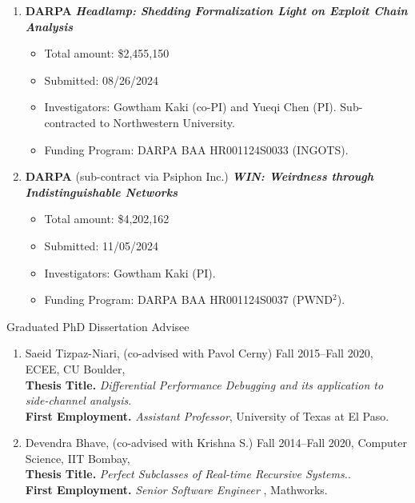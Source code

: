 \documentclass{article}
\begin{document}
\begin{enumerate}
\item {\bf DARPA} {\bf\emph{Headlamp: Shedding Formalization Light on Exploit Chain Analysis}} 
  \begin{itemize}
  \item
    Total amount: \$2,455,150 
  \item  
    Submitted: 08/26/2024 
  \item 
    Investigators: Gowtham Kaki (co-PI) and Yueqi Chen (PI). Sub-contracted
    to Northwestern University. 
  \item 
      Funding Program: DARPA BAA HR001124S0033 (INGOTS).  
  \end{itemize}

\item {\bf DARPA} (sub-contract via Psiphon Inc.) {\bf\emph{WIN: Weirdness through Indistinguishable Networks}} 
  \begin{itemize}
  \item
    Total amount: \$4,202,162
  \item  
    Submitted: 11/05/2024 
  \item 
    Investigators: Gowtham Kaki (PI). 
  \item 
      Funding Program:  DARPA BAA HR001124S0037 (PWND$^2$).  
  \end{itemize}

\end{enumerate}


\vspace{1em}
\noindent Graduated PhD Dissertation Advisee
\begin{enumerate}
\item Saeid Tizpaz-Niari, (co-advised with Pavol Cerny) Fall 2015--Fall 2020,
ECEE, CU Boulder,\\
{\bf Thesis Title.} {\em Differential Performance Debugging and its application to
side-channel analysis}. \\{\bf First Employment.} {\it Assistant Professor},
University of Texas at El Paso. 
\item Devendra Bhave, (co-advised with Krishna S.)  Fall 2014--Fall 2020, Computer Science, IIT Bombay,\\
{\bf Thesis Title.} {\em Perfect Subclasses of Real-time Recursive Systems.}. \\
{\bf First Employment.} {\it Senior Software Engineer }, Mathworks. 
\end{enumerate}
\end{document}
